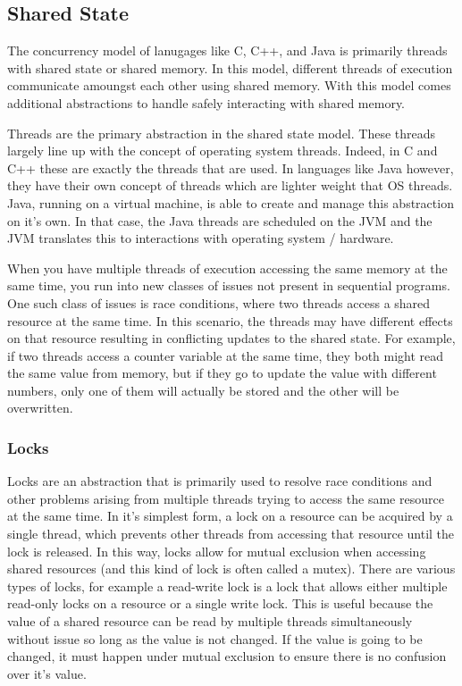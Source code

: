 \documentclass{article}
\begin{document}
\subsection{Shared State}
The concurrency model of lanugages like C, C++, and Java is primarily threads with
shared state or shared memory. In this model, different threads of execution communicate
amoungst each other using shared memory. With this model comes additional abstractions
to handle safely interacting with shared memory.

Threads are the primary abstraction in the shared state model. These threads
largely line up with the concept of operating system threads. Indeed, in C and
C++ these are exactly the threads that are used. In languages like Java however,
they have their own concept of threads which are lighter weight that OS threads.
Java, running on a virtual machine, is able to create and manage this
abstraction on it's own. In that case, the Java threads are scheduled on the JVM
and the JVM translates this to interactions with operating system / hardware.

When you have multiple threads of execution accessing the same memory at the
same time, you run into new classes of issues not present in sequential
programs. One such class of issues is race conditions, where two threads access
a shared resource at the same time. In this scenario, the threads may have
different effects on that resource resulting in conflicting updates to the
shared state. For example, if two threads access a counter variable at the same
time, they both might read the same value from memory, but if they go to update
the value with different numbers, only one of them will actually be stored and
the other will be overwritten.

\subsubsection{Locks}
Locks are an abstraction that is primarily used to resolve race conditions and
other problems arising from multiple threads trying to access the same resource
at the same time. In it's simplest form, a lock on a resource can be acquired by
a single thread, which prevents other threads from accessing that resource until
the lock is released. In this way, locks allow for mutual exclusion when accessing
shared resources (and this kind of lock is often called a mutex). There are various
types of locks, for example a read-write lock is a lock that allows either multiple
read-only locks on a resource or a single write lock. This is useful because the
value of a shared resource can be read by multiple threads simultaneously without
issue so long as the value is not changed. If the value is going to be changed, it
must happen under mutual exclusion to ensure there is no confusion over it's value.
\end{document}
